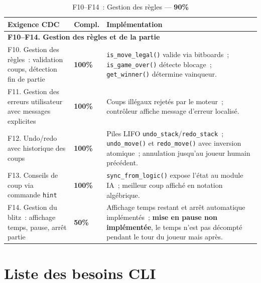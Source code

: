 \documentclass[a4paper]{article}
\begin{document}
\begin{table}[H]
\centering
\renewcommand{\arraystretch}{1.4}
\begin{tabular}{|p{6cm}|p{1.5cm}|p{8cm}|}
\hline
\textbf{Exigence CDC} & \textbf{Compl.} & \textbf{Implémentation} \\
\hline
\multicolumn{3}{|l|}{\textbf{F10--F14. Gestion des règles et de la partie}} \\
\hline
F10. Gestion des règles~: validation coups, détection fin de partie
& \textbf{100\%}
& \texttt{is\_move\_legal()} valide via bitboards~; \texttt{is\_game\_over()} détecte blocage~; \texttt{get\_winner()} détermine vainqueur. \\
\hline
F11. Gestion des erreurs utilisateur avec messages explicites
& \textbf{100\%}
& Coups illégaux rejetés par le moteur~; contrôleur affiche message d'erreur localisé. \\
\hline
F12. Undo/redo avec historique des coups
& \textbf{100\%}
& Piles LIFO \texttt{undo\_stack}/\texttt{redo\_stack}~; \texttt{undo\_move()} et \texttt{redo\_move()} avec inversion atomique~; annulation jusqu'au joueur humain précédent. \\
\hline
F13. Conseils de coup via commande \texttt{hint}
& \textbf{100\%}
& \texttt{sync\_from\_logic()} expose l'état au module IA~; meilleur coup affiché en notation algébrique. \\
\hline
F14. Gestion du blitz~: affichage temps, pause, arrêt partie
& \textbf{50\%}
& Affichage temps restant et arrêt automatique implémentés~; \textbf{mise en pause non implémentée}, le temps n'est pas décompté pendant le tour du joueur mais après. \\
\hline
\end{tabular}
\caption{F10--F14~: Gestion des règles --- \textbf{90\%}}
\label{tab:f10-f14}
\end{table}
 
 
\section{Liste des besoins CLI}
\label{ann:besoins-cli}
 
 
\end{document}
